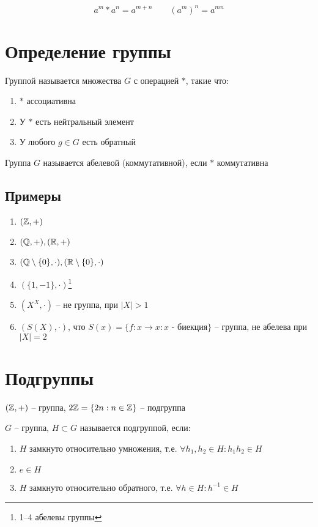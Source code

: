 \documentclass[main]{subfiles}
\begin{document}
\[a^m * a^n = a^{m+n} \qquad (a^m)^n = a^ {mn}\]

\section{Определение группы}

\begin{definition}
    Группой называется множества $G$ с операцией $*$, такие что:
    \begin{enumerate}
        \item $*$ ассоциативна
        \item У $*$ есть нейтральный элемент
        \item У любого $g\in G$ есть обратный
    \end{enumerate}
    Группа $G$ называется абелевой (коммутативной), если $*$ коммутативна
\end{definition}

\subsection{Примеры}
\begin{enumerate}
    \item $(\mathbb{Z}, +)$
    \item $(\mathbb{Q}, +), (\mathbb{R}, +)$
    \item $(\mathbb{Q} \setminus \{0\}, \cdot), (\mathbb{R} \setminus \{0\}, \cdot)$
    \item $(\{1, -1\}, \cdot)$\footnote{1--4 абелевы группы}
    \item $(X^X, \cdot)$ -- не группа, при $|X| > 1$
    \item $(S(X), \cdot)$, что
          $S(x)=\{f:x\to x : x \text{ - биекция}\}$ -- группа,
          не абелева при $|X| = 2$
\end{enumerate}

\section{Подгруппы}

\begin{example}
    $(\mathbb{Z}, +)$ -- группа, $2\mathbb{Z} = \{2n: n \in \mathbb{Z}\}$ -- подгруппа
\end{example}

\begin{definition}
    $G$ -- группа, $H \subset G$ называется подгруппой, если:
    \begin{enumerate}
        \item $H$ замкнуто относительно умножения, т.е. $\forall h_1, h_2 \in H: h_1 h_2 \in H$
        \item $e \in H$
        \item $H$ замкнуто относительно обратного, т.е. $\forall h \in H: h^{-1} \in H$
    \end{enumerate}
\end{definition}
\end{document}
